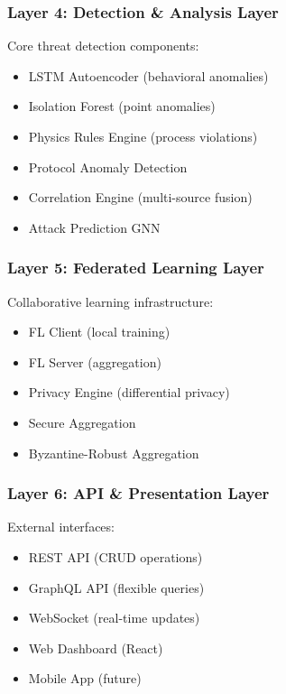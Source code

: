 \documentclass[12pt,a4paper]{article}
\begin{document}
\subsubsection{Layer 4: Detection \& Analysis Layer}

Core threat detection components:
\begin{itemize}[leftmargin=1cm,itemsep=0pt]
    \item LSTM Autoencoder (behavioral anomalies)
    \item Isolation Forest (point anomalies)
    \item Physics Rules Engine (process violations)
    \item Protocol Anomaly Detection
    \item Correlation Engine (multi-source fusion)
    \item Attack Prediction GNN
\end{itemize}

\subsubsection{Layer 5: Federated Learning Layer}

Collaborative learning infrastructure:
\begin{itemize}[leftmargin=1cm,itemsep=0pt]
    \item FL Client (local training)
    \item FL Server (aggregation)
    \item Privacy Engine (differential privacy)
    \item Secure Aggregation
    \item Byzantine-Robust Aggregation
\end{itemize}

\subsubsection{Layer 6: API \& Presentation Layer}

External interfaces:
\begin{itemize}[leftmargin=1cm,itemsep=0pt]
    \item REST API (CRUD operations)
    \item GraphQL API (flexible queries)
    \item WebSocket (real-time updates)
    \item Web Dashboard (React)
    \item Mobile App (future)
\end{itemize}
\end{document}
